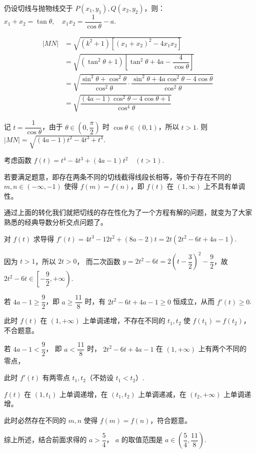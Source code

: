 \begin{solutions}
仍设切线与抛物线交于 $P(x_1, y_1), Q(x_2, y_2)$，则：$x_1 + x_2 = \tan\theta, \quad x_1 x_2 = \dfrac{1}{\cos\theta} - a$.


\begin{align*}
|MN| &= \sqrt{(k^2+1)[(x_1+x_2)^2 - 4x_1x_2]} \\
&= \sqrt{(\tan^2\theta+1)\left[\tan^2\theta + 4a - \dfrac{4}{\cos\theta}\right]} \\
&= \sqrt{\dfrac{\sin^2\theta+\cos^2\theta}{\cos^2\theta} \cdot \dfrac{\sin^2\theta + 4a\cos^2\theta - 4\cos\theta}{\cos^2\theta}} \\
&= \sqrt{\dfrac{(4a-1)\cos^2\theta - 4\cos\theta + 1}{\cos^4\theta}}
\end{align*}


记 $t = \dfrac{1}{\cos\theta}$，由于 $\theta \in \left(0, \dfrac{\pi}{2}\right)$ 时 $\cos\theta \in (0, 1)$，所以 $t > 1$. 则 $|MN| = \sqrt{(4a-1)t^2 - 4t^3 + t^4}$.

考虑函数 $f(t) = t^4 - 4t^3 + (4a-1)t^2 \quad (t > 1)$.

若要满足题意，即存在两条不同的切线截得线段长相等，等价于存在不同的 $m, n \in (-\infty, -1)$ 使得 $f(m) = f(n)$，即 $f(t)$ 在 $(1,\infty)$ 上不具有单调性。

通过上面的转化我们就把切线的存在性化为了一个方程有解的问题，就变为了大家熟悉的经典导数分析交点问题了。

对 $f(t)$ 求导得 $f'(t) = 4t^3 - 12t^2 + (8a-2)t = 2t(2t^2 - 6t + 4a - 1)$.

因为 $t > 1$，所以 $2t > 0$，
而二次函数 $y = 2t^2 - 6t=2(t-\dfrac{3}{2})^2-\dfrac{9}{2}$，故 $2t^2 - 6t \in \left[-\dfrac{9}{2}, +\infty\right)$.

若 $4a - 1 \geqslant  \dfrac{9}{2} $，即 $a \geqslant \dfrac{11}{8}$ 时，有 $2t^2 - 6t + 4a - 1 \geqslant 0$ 恒成立，从而 $f'(t) \geqslant 0$.

此时 $f(t)$ 在 $(1,+\infty)$ 上单调递增，不存在不同的 $t_1, t_2$ 使 $f(t_1) = f(t_2)$，不合题意。

若 $4a - 1 < \dfrac{9}{2} $， 即 $a < \dfrac{11}{8}$ 时， $2t^2 - 6t + 4a - 1$ 在 $(1,+\infty)$ 上有两个不同的零点，

此时 $f'(t)$ 有两零点 $t_1, t_2$（不妨设 $t_1 < t_2$）.

$f(t)$ 在 $(1,t_1)$ 上单调递增，在 $(t_1, t_2)$ 上单调递减，在 $(t_2, +\infty)$ 上单调递增。

此时必然存在不同的 $m, n$ 使得 $f(m) = f(n)$，符合题意。

综上所述，结合前面求得的 $a > \dfrac{5}{4}$，
$a$ 的取值范围是 $a \in \left(\dfrac{5}{4}, \dfrac{11}{8}\right)$.
\end{solutions}
